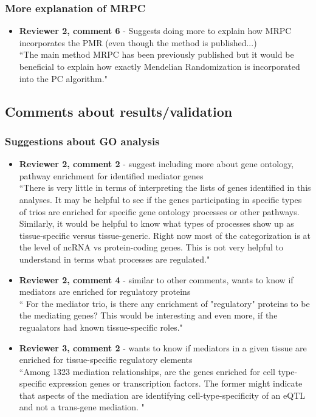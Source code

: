 \documentclass[a4paper,12pt]{article}
\begin{document}
	\subsubsection*{More explanation of MRPC}
	\begin{itemize}
		\item \textbf{Reviewer 2, comment 6} - Suggests doing more to explain how MRPC incorporates the PMR (even though the method is published...)\\
		
		``The main method MRPC has been previously published but it would be beneficial to explain how exactly Mendelian Randomization is incorporated into the PC algorithm."
	\end{itemize}
	
	
	\subsection*{Comments about results/validation}
	\subsubsection*{Suggestions about GO analysis}
	\begin{itemize}

		\item \textbf{Reviewer 2, comment 2} - suggest including more about gene ontology, pathway enrichment for identified mediator genes\\
		
		``There is very little in terms of interpreting the lists of genes identified in this analyses. It may be helpful to see if the genes participating in specific types of trios are enriched for specific gene ontology processes or other pathways. Similarly, it would be helpful to know what types of processes show up as tissue-specific versus tissue-generic. Right now most of the categorization is at the level of ncRNA vs protein-coding genes. This is not very helpful to understand in terms what processes are regulated."
		
		\item \textbf{Reviewer 2, comment 4} - similar to other comments, wants to know if mediators are enriched for regulatory proteins\\
		
		`` For the mediator trio, is there any enrichment of "regulatory" proteins to be the mediating genes? This would be interesting and even more, if the regualators had known tissue-specific roles."
		
		\item \textbf{Reviewer 3, comment 2} - wants to know if mediators in a given tissue are enriched for tissue-specific regulatory elements\\
		
		``Among 1323 mediation relationships, are the genes enriched for cell type-specific expression genes or transcription factors. The former might indicate that aspects of the mediation are identifying cell-type-specificity of an eQTL and not a trans-gene mediation. "
		
		
	\end{itemize}
	
\end{document}
